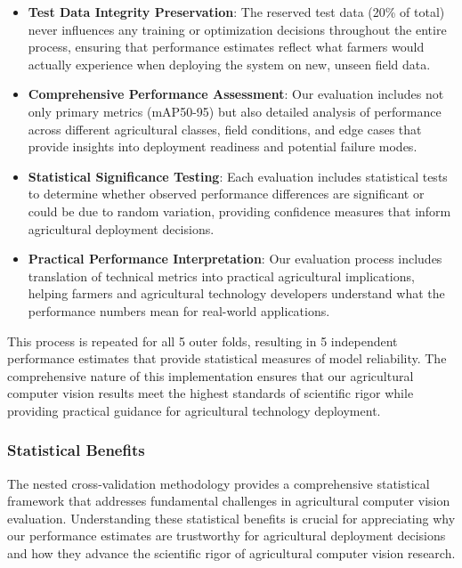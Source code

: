 \begin{itemize}
    \item \textbf{Test Data Integrity Preservation}: The reserved test data (20\% of total) never influences any training or optimization decisions throughout the entire process, ensuring that performance estimates reflect what farmers would actually experience when deploying the system on new, unseen field data.
    
    \item \textbf{Comprehensive Performance Assessment}: Our evaluation includes not only primary metrics (mAP50-95) but also detailed analysis of performance across different agricultural classes, field conditions, and edge cases that provide insights into deployment readiness and potential failure modes.
    
    \item \textbf{Statistical Significance Testing}: Each evaluation includes statistical tests to determine whether observed performance differences are significant or could be due to random variation, providing confidence measures that inform agricultural deployment decisions.
    
    \item \textbf{Practical Performance Interpretation}: Our evaluation process includes translation of technical metrics into practical agricultural implications, helping farmers and agricultural technology developers understand what the performance numbers mean for real-world applications.
\end{itemize}

This process is repeated for all 5 outer folds, resulting in 5 independent performance estimates that provide statistical measures of model reliability. The comprehensive nature of this implementation ensures that our agricultural computer vision results meet the highest standards of scientific rigor while providing practical guidance for agricultural technology deployment.

\subsubsection{Statistical Benefits}

The nested cross-validation methodology provides a comprehensive statistical framework that addresses fundamental challenges in agricultural computer vision evaluation. Understanding these statistical benefits is crucial for appreciating why our performance estimates are trustworthy for agricultural deployment decisions and how they advance the scientific rigor of agricultural computer vision research.

